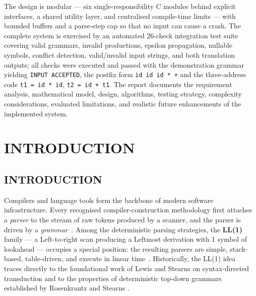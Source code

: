 \documentclass[12pt,a4paper,oneside,openany]{report}
\begin{document}
The design is modular --- six single-responsibility C modules behind explicit
interfaces, a shared utility layer, and centralised compile-time limits ---
with bounded buffers and a parse-step cap so that no input can cause a crash.
The complete system is exercised by an automated 26-check integration test
suite covering valid grammars, invalid productions, epsilon propagation,
nullable symbols, conflict detection, valid/invalid input strings, and both
translation outputs; all checks were executed and passed with the demonstration
grammar yielding \texttt{INPUT ACCEPTED}, the postfix form \texttt{id id id * +}
and the three-address code \texttt{t1 = id * id}, \texttt{t2 = id + t1}.
The report documents the requirement analysis, mathematical model, design,
algorithms, testing strategy, complexity considerations, evaluated limitations,
and realistic future enhancements of the implemented system.


\clearpage




\setcounter{page}{1}






\chapter{INTRODUCTION}
\label{ch:intro}

\section{INTRODUCTION}
Compilers and language tools form the backbone of modern software
infrastructure. Every recognised compiler-construction methodology first
attaches a \emph{parser} to the stream of raw tokens produced by a scanner,
and the parser is driven by a \emph{grammar}~\cite{aho2006compilers}. Among
the deterministic parsing strategies, the \textbf{LL(1)} family --- a
Left-to-right scan producing a Leftmost derivation with 1 symbol of lookahead
--- occupies a special position: the resulting parsers are simple,
stack-based, table-driven, and execute in linear time~\cite{lewis1968,
rosenkrantz1970, gruene2008}. Historically, the LL(1) idea traces directly
to the foundational work of Lewis and Stearns on syntax-directed transduction
\cite{lewis1968} and to the properties of deterministic top-down grammars
established by Rosenkrantz and Stearns \cite{rosenkrantz1970}.
\end{document}
